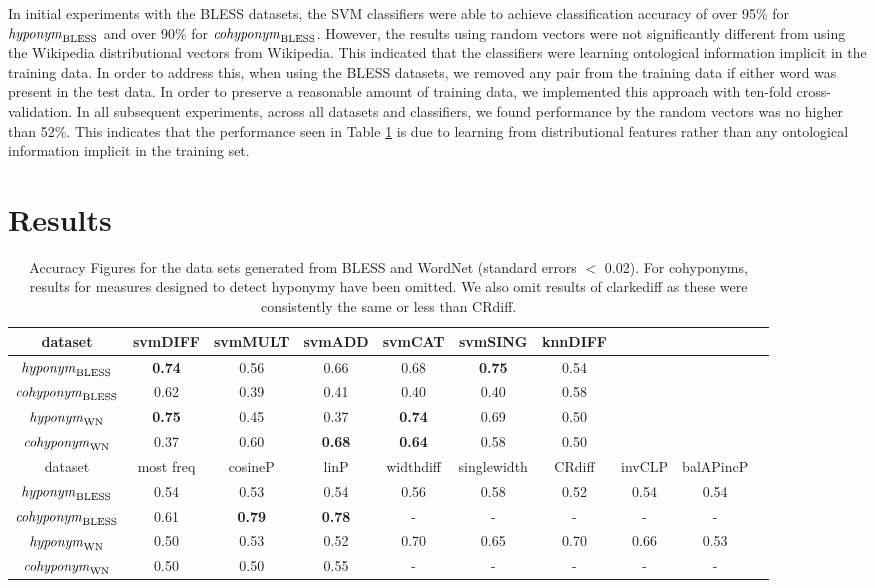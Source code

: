 \documentclass[11pt]{article}
\newcommand\entBLESS{\mbox{\em hyponym\/}_{\mbox{\scriptsize BLESS}}}
\newcommand\coordBLESS{\mbox{\em cohyponym\/}_{\mbox{\scriptsize BLESS}}}
\newcommand\entWN{\mbox{\em hyponym\/}_{\mbox{\scriptsize WN}}}
\newcommand\coordWN{\mbox{\em cohyponym\/}_{\mbox{\scriptsize WN}}}
\begin{document}
In initial experiments with the BLESS datasets, the SVM classifiers were able to achieve classification accuracy of over 95\% for $\entBLESS$ and over 90\% for $\coordBLESS$.  However, the results using random vectors were not significantly different from
using the Wikipedia distributional vectors from Wikipedia.  This indicated that the classifiers were
learning ontological information implicit in the training data. In
order to address this, when using the BLESS datasets, we removed any pair from the training data if
either word was present in the test data. In order to preserve a
reasonable amount of training data, we implemented this approach with
ten-fold cross-validation.   In all subsequent experiments, across all datasets and classifiers, we found performance by the random vectors was no higher than 52\%.  This indicates that the performance seen in Table \ref{table:results_ent} is due to learning from distributional features rather than any ontological information implicit in the training set.

\section{Results}
\label{sect:results}


\begin{table}[ht]
\centering
\begin{tabular}{cccccccccc}
\hline
\small dataset&\small svmDIFF&\small svmMULT&\small svmADD&\small svmCAT&\small svmSING&\small knnDIFF\\
\hline
\small $\entBLESS$&\textbf{0.74}&0.56&0.66&0.68&\textbf{0.75}&0.54\\
\small $\coordBLESS$&0.62&0.39&0.41&0.40&0.40&0.58\\
\small $\entWN$&\textbf{0.75}&0.45&0.37&\textbf{0.74}&0.69&0.50\\
\small $\coordWN$&0.37&0.60&\textbf{0.68}&\textbf{0.64}&0.58&0.50\\
\hline
\small dataset&\small most freq&\small cosineP&\small linP&\small widthdiff&\small singlewidth&\small CRdiff&\small invCLP&\small balAPincP\\
\hline
\small $\entBLESS$&0.54&0.53&0.54&0.56&0.58&0.52&0.54&0.54\\
\small $\coordBLESS$&0.61&\textbf{0.79}&\textbf{0.78}&-&-&-&-&-\\
\small $\entWN$&0.50&0.53&0.52&0.70&0.65&0.70&0.66&0.53\\
\small $\coordWN$&0.50&0.50&0.55&-&-&-&-&-\\
\end{tabular}
\caption{Accuracy Figures for the data sets generated from BLESS and WordNet
  (standard errors $<$ 0.02). For cohyponyms, results for measures
  designed to detect hyponymy have been omitted.  We also omit results of clarkediff as these were consistently the same or less than CRdiff.}
\label{table:results_ent}
\end{table}
\end{document}
